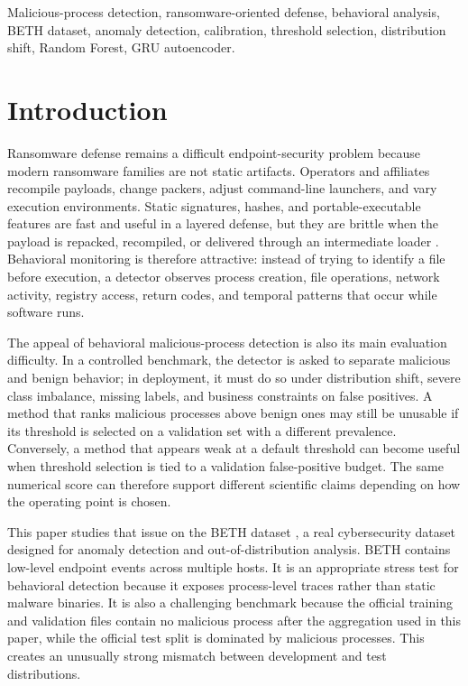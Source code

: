 \documentclass[journal]{IEEEtran}
\begin{document}
\begin{IEEEkeywords}
Malicious-process detection, ransomware-oriented defense, behavioral analysis, BETH dataset, anomaly detection, calibration, threshold selection, distribution shift, Random Forest, GRU autoencoder.
\end{IEEEkeywords}

\section{Introduction}
\label{sec:intro}

Ransomware defense remains a difficult endpoint-security problem because modern ransomware families are not static artifacts. Operators and affiliates recompile payloads, change packers, adjust command-line launchers, and vary execution environments. Static signatures, hashes, and portable-executable features are fast and useful in a layered defense, but they are brittle when the payload is repacked, recompiled, or delivered through an intermediate loader \cite{sikorski2012,anderson2018}. Behavioral monitoring is therefore attractive: instead of trying to identify a file before execution, a detector observes process creation, file operations, network activity, registry access, return codes, and temporal patterns that occur while software runs.

The appeal of behavioral malicious-process detection is also its main evaluation difficulty. In a controlled benchmark, the detector is asked to separate malicious and benign behavior; in deployment, it must do so under distribution shift, severe class imbalance, missing labels, and business constraints on false positives. A method that ranks malicious processes above benign ones may still be unusable if its threshold is selected on a validation set with a different prevalence. Conversely, a method that appears weak at a default threshold can become useful when threshold selection is tied to a validation false-positive budget. The same numerical score can therefore support different scientific claims depending on how the operating point is chosen.

This paper studies that issue on the BETH dataset \cite{highnam2021}, a real cybersecurity dataset designed for anomaly detection and out-of-distribution analysis. BETH contains low-level endpoint events across multiple hosts. It is an appropriate stress test for behavioral detection because it exposes process-level traces rather than static malware binaries. It is also a challenging benchmark because the official training and validation files contain no malicious process after the aggregation used in this paper, while the official test split is dominated by malicious processes. This creates an unusually strong mismatch between development and test distributions.
\end{document}
